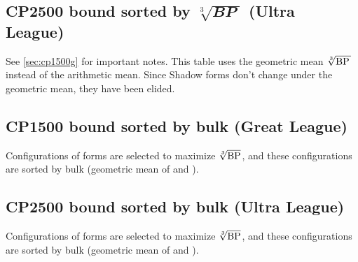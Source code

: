 \subsection[CP2500 bound sorted by \protect{$\sqrt[3]{\BP\,}$} (Ultra League)]%
{CP2500 bound sorted by $\sqrt[3]{\mathbfit{BP}\;}$ (Ultra League)\label{sec:cp2500g}}
See \autoref{sec:cp1500g} for important notes.
This table uses the geometric mean $\sqrt[3]{\mbox{BP}{}\,}$ instead of the arithmetic mean.
Since Shadow forms don't change under the geometric mean, they have been elided.

\subsection[CP1500 bounded sorted by bulk (Great League)]
{CP1500 bound sorted by bulk (Great League)\label{subsec:cp1500b}}
Configurations of forms are selected to maximize $\sqrt[3]{\mbox{BP}}$, and these
 configurations are sorted by bulk (geometric mean of \MHP and ).

\subsection[CP2500 bounded sorted by bulk (Ultra League)]
{CP2500 bound sorted by bulk (Ultra League)\label{subsec:cp2500b}}
Configurations of forms are selected to maximize $\sqrt[3]{\mbox{BP}}$, and these
 configurations are sorted by bulk (geometric mean of \MHP and ).

